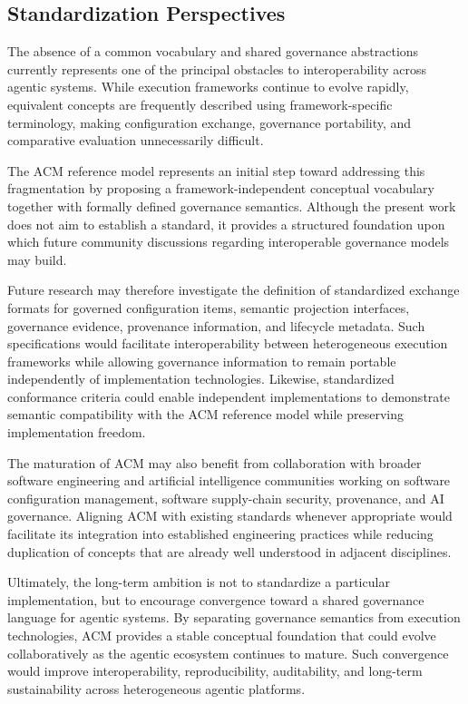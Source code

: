 \documentclass[10pt]{article}
\begin{document}
\subsection{Standardization Perspectives}
\label{sec:future_standardization}

The absence of a common vocabulary and shared governance abstractions currently represents one of the principal obstacles to interoperability across agentic systems. While execution frameworks continue to evolve rapidly, equivalent concepts are frequently described using framework-specific terminology, making configuration exchange, governance portability, and comparative evaluation unnecessarily difficult.

The ACM reference model represents an initial step toward addressing this fragmentation by proposing a framework-independent conceptual vocabulary together with formally defined governance semantics. Although the present work does not aim to establish a standard, it provides a structured foundation upon which future community discussions regarding interoperable governance models may build.

Future research may therefore investigate the definition of standardized exchange formats for governed configuration items, semantic projection interfaces, governance evidence, provenance information, and lifecycle metadata. Such specifications would facilitate interoperability between heterogeneous execution frameworks while allowing governance information to remain portable independently of implementation technologies. Likewise, standardized conformance criteria could enable independent implementations to demonstrate semantic compatibility with the ACM reference model while preserving implementation freedom.

The maturation of ACM may also benefit from collaboration with broader software engineering and artificial intelligence communities working on software configuration management, software supply-chain security, provenance, and AI governance. Aligning ACM with existing standards whenever appropriate would facilitate its integration into established engineering practices while reducing duplication of concepts that are already well understood in adjacent disciplines.

Ultimately, the long-term ambition is not to standardize a particular implementation, but to encourage convergence toward a shared governance language for agentic systems. By separating governance semantics from execution technologies, ACM provides a stable conceptual foundation that could evolve collaboratively as the agentic ecosystem continues to mature. Such convergence would improve interoperability, reproducibility, auditability, and long-term sustainability across heterogeneous agentic platforms.
\end{document}
